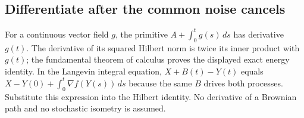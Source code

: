 \documentclass[11pt,a4paper]{report}
\begin{document}
\subsection{\texorpdfstring{Differentiate after the common noise cancels}{Differentiate after the common noise cancels}}
\label{report-step-AverageLMC-PathwiseEnergy-lean-3}


For a continuous vector field \(g\), the primitive \(A+\int_0^t g(s)\,ds\) has derivative \(g(t)\). The derivative of its squared Hilbert norm is twice its inner product with \(g(t)\); the fundamental theorem of calculus proves the displayed exact energy identity. In the Langevin integral equation, \(X+B(t)-Y(t)\) equals \(X-Y(0)+\int_0^t\nabla f(Y(s))\,ds\) because the same \(B\) drives both processes. Substitute this expression into the Hilbert identity. No derivative of a Brownian path and no stochastic isometry is assumed.
\end{document}
